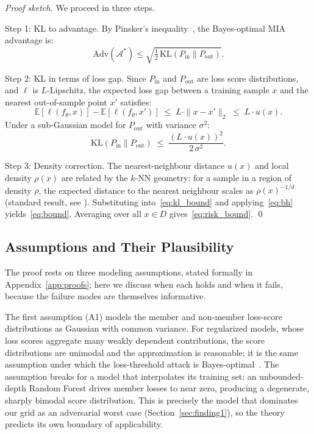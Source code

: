 \begin{proof}[Proof sketch]
We proceed in three steps.

Step 1: KL to advantage.
By Pinsker's inequality~\cite{tsybakov2009introduction}, the Bayes-optimal
MIA advantage is:
\begin{equation}
  \mathrm{Adv}(\mathcal{A}^*) \leq
  \sqrt{\tfrac{1}{2}\,\mathrm{KL}(P_{\mathrm{in}} \| P_{\mathrm{out}})}.
  \label{eq:bh}
\end{equation}

Step 2: KL in terms of loss gap.
Since $P_{\mathrm{in}}$ and $P_{\mathrm{out}}$ are loss score distributions,
and $\ell$ is $L$-Lipschitz, the expected loss gap between a training
sample $x$ and the nearest out-of-sample point $x'$ satisfies:
\begin{equation}
  \mathbb{E}[\ell(f_\theta, x)] - \mathbb{E}[\ell(f_\theta, x')]
  \;\leq\; L \cdot \|x - x'\|_2
  \;\leq\; L \cdot u(x).
  \label{eq:lipschitz_gap}
\end{equation}
Under a sub-Gaussian model for $P_{\mathrm{out}}$ with variance $\sigma^2$:
\begin{equation}
  \mathrm{KL}(P_{\mathrm{in}} \| P_{\mathrm{out}})
  \;\leq\;
  \frac{(L \cdot u(x))^2}{2\,\sigma^2}.
  \label{eq:kl_bound}
\end{equation}

Step 3: Density correction.
The nearest-neighbour distance $u(x)$ and local density $\rho(x)$ are
related by the $k$-NN geometry: for a sample in a region of density
$\rho$, the expected distance to the nearest neighbour scales as
$\rho(x)^{-1/d}$ (standard result, see \cite{biau2015lectures}).
Substituting into~\eqref{eq:kl_bound} and applying~\eqref{eq:bh}
yields~\eqref{eq:bound}.
Averaging over all $x \in D$ gives~\eqref{eq:risk_bound}.
\qed
\end{proof}

\subsection{Assumptions and Their Plausibility}
\label{sec:assumptions}

The proof rests on three modeling assumptions, stated formally in
Appendix~\ref{app:proofs}; here we discuss when each holds and when it
fails, because the failure modes are themselves informative.

The first assumption (A1) models the member and non-member loss-score
distributions as Gaussian with common variance. For regularized models,
whose loss scores aggregate many weakly dependent contributions, the
score distributions are unimodal and the approximation is reasonable;
it is the same assumption under which the loss-threshold attack is
Bayes-optimal~\cite{sablayrolles2019whitebox,carlini2022lira}. The
assumption breaks for a model that interpolates its training set: an
unbounded-depth Random Forest drives member losses to near zero,
producing a degenerate, sharply bimodal score distribution. This is
precisely the model that dominates our grid as an adversarial worst
case (Section~\ref{sec:finding1}), so the theory predicts its own
boundary of applicability.


